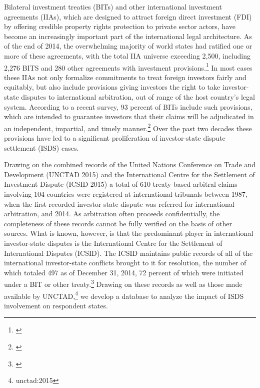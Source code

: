 \documentclass[12pt,onesided]{amsart}
\begin{document}
Bilateral investment treaties (BITs) and other international investment agreements (IIAs), which are designed to attract foreign direct investment (FDI) by offering credible property rights protection to private sector actors, have become an increasingly important part of the international legal architecture. As of the end of 2014, the overwhelming majority of world states had ratified one or more of these agreements, with the total IIA universe exceeding 2,500, including 2,276 BITS and 280 other agreements with investment provisions.\footnote{\citet{unctad:2015}} In most cases these IIAs not only formalize commitments to treat foreign investors fairly and equitably, but also include provisions giving investors the right to take investor-state disputes to international arbitration, out of range of the host country's legal system. According to a recent survey, 93 percent of BITs include such provisions, which are intended to guarantee investors that their claims will be adjudicated in an independent, impartial, and timely manner.\footnote{\citet[p. 8]{gaukordger:gordon:2012}} Over the past two decades these provisions have led to a significant proliferation of investor-state dispute settlement (ISDS) cases.


Drawing on the combined records of the United Nations Conference on Trade and Development (UNCTAD 2015) and the International Centre for the Settlement of Investment Dispute (ICSID 2015) a total of 610 treaty-based arbitral claims involving 104 countries were registered at international tribunals between 1987, when the first recorded investor-state dispute was referred for international arbitration, and 2014. As arbitration often proceeds confidentially, the completeness of these records cannot be fully verified on the basis of other sources. What is known, however, is that the predominant player in international investor-state disputes is the International Centre for the Settlement of International Disputes (ICSID). The ICSID maintains public records of all of the international investor-state conflicts brought to it for resolution, the number of which totaled 497 as of December 31, 2014, 72 percent of which were initiated under a BIT or other treaty.\footnote{\citet[p. 7, 10]{icsid:2015}} Drawing on these records as well as those made available by UNCTAD,\footnote{unctad:2015} we develop a database to analyze the impact of ISDS involvement on respondent states. 
\end{document}

